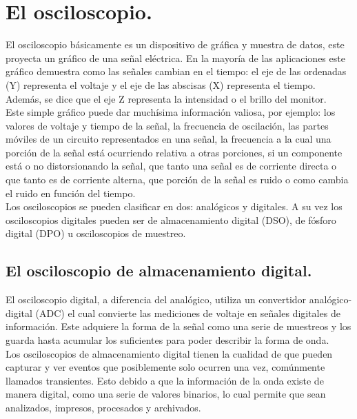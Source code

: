 \documentclass[12pt,letterpaper]{report}
\begin{document}
\section{El osciloscopio.} El osciloscopio básicamente es un dispositivo de gráfica y muestra de datos, este proyecta un gráfico de una señal eléctrica. En la mayoría de las aplicaciones este gráfico demuestra como las señales cambian en el tiempo: el eje de las ordenadas (Y) representa el voltaje y el eje de las abscisas (X) representa el tiempo. Además, se dice que el eje Z representa la intensidad o el brillo del monitor.\\
Este simple gráfico puede dar muchísima información valiosa, por ejemplo: los valores de voltaje y tiempo de la señal, la frecuencia de oscilación, las partes móviles de un circuito representados en una señal, la frecuencia a la cual una porción de la señal está ocurriendo relativa a otras porciones, si un componente está o no distorsionando la señal, que tanto una señal es de corriente directa o que tanto es de corriente alterna, que porción de la señal es ruido o como cambia el ruido en función del tiempo.\\
Los osciloscopios se pueden clasificar en dos: analógicos y digitales. A su vez los osciloscopios digitales pueden ser de almacenamiento digital (DSO), de fósforo digital (DPO) u osciloscopios de muestreo.
\subsection{El osciloscopio de almacenamiento digital.} El osciloscopio digital, a diferencia del analógico, utiliza un convertidor analógico-digital (ADC) el cual convierte las mediciones de voltaje en señales digitales de información. Este adquiere la forma de la señal como una serie de muestreos y los guarda hasta acumular los suficientes para poder describir la forma de onda.\\
Los osciloscopios de almacenamiento digital tienen la cualidad de que pueden capturar y ver eventos que posiblemente solo ocurren una vez, comúnmente llamados transientes. Esto debido a que la información de la onda existe de manera digital, como una serie de valores binarios, lo cual permite que sean analizados, impresos, procesados y archivados.
\end{document}
